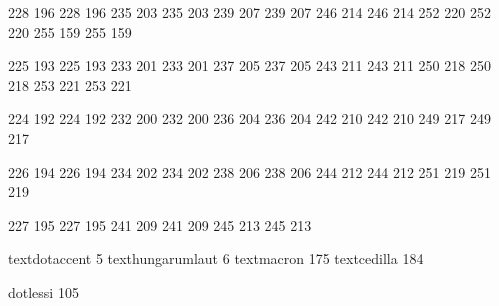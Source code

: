 

\startmapping[texnansi] 

 228 196  228 196  
 235 203  235 203
 239 207  239 207
 246 214  246 214
 252 220  252 220
 255 159  255 159

 225 193  225 193
 233 201  233 201
 237 205  237 205
 243 211  243 211
 250 218  250 218
 253 221  253 221

 224 192  224 192
 232 200  232 200
 236 204  236 204
 242 210  242 210
 249 217  249 217

 226 194  226 194
 234 202  234 202
 238 206  238 206
 244 212  244 212
 251 219  251 219

 227 195  227 195
 241 209  241 209
 245 213  245 213

\stopmapping

\startencoding[texnansi]

 textdotaccent       5
 texthungarumlaut    6
 textmacron        175 
 textcedilla       184  

 dotlessi          105 

